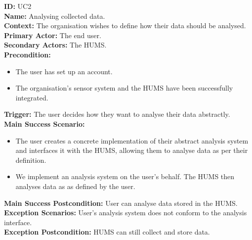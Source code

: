 \documentclass[10pt,a4paper]{article}
\begin{document}
\noindent \textbf{ID:} UC2\\
\textbf{Name:} Analysing collected data.\\
\textbf{Context:} The organisation wishes to define how their data should be analysed.\\
\textbf{Primary Actor:} The end user.\\
\textbf{Secondary Actors:} The HUMS.\\
\textbf{Precondition:}
\begin{itemize}
\item The user has set up an account.
\item The organisation's sensor system and the HUMS have been successfully integrated.
\end{itemize}
\textbf{Trigger:} The user decides how they want to analyse their data abstractly.\\
\textbf{Main Success Scenario:}
\begin{itemize}
\item The user creates a concrete implementation of their abstract analysis system and interfaces it with the HUMS, allowing them to analyse data as per their definition.
\item We implement an analysis system on the user's behalf. The HUMS then analyses data as as defined by the user.
\end{itemize}
\textbf{Main Success Postcondition:} User can analyse data stored in the HUMS.\\
\textbf{Exception Scenarios:} User's analysis system does not conform to the analysis interface.\\
\textbf{Exception Postcondition:} HUMS can still collect and store data.\\\\
\end{document}
